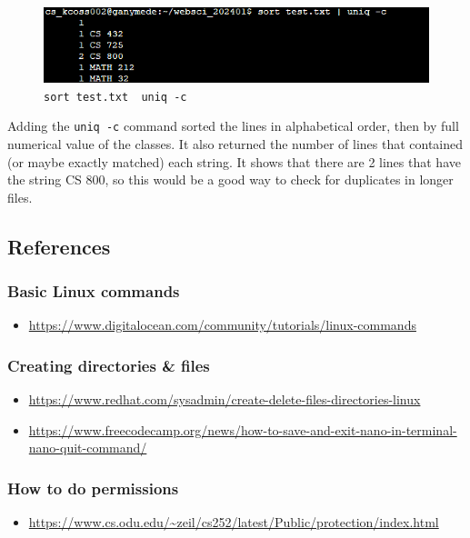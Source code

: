 \documentclass[
]{article}
\providecommand{\tightlist}{%
  \setlength{\itemsep}{0pt}\setlength{\parskip}{0pt}}
\begin{document}
\begin{figure}
\centering
\includegraphics{linux_cmd_8_sortuniq.png}
\caption{\texttt{sort\ test.txt\ \textbar{}\ uniq\ -c}}
\end{figure}

Adding the \texttt{uniq\ -c} command sorted the lines in alphabetical
order, then by full numerical value of the classes. It also returned the
number of lines that contained (or maybe exactly matched) each string.
It shows that there are 2 lines that have the string CS 800, so this
would be a good way to check for duplicates in longer files.

\hypertarget{references}{%
\subsection{\texorpdfstring{\textbf{References}}{References}}\label{references}}

\hypertarget{basic-linux-commands}{%
\subsubsection{Basic Linux commands}\label{basic-linux-commands}}

\begin{itemize}
\tightlist
\item
  \url{https://www.digitalocean.com/community/tutorials/linux-commands}
\end{itemize}

\hypertarget{creating-directories-files}{%
\subsubsection{Creating directories \&
files}\label{creating-directories-files}}

\begin{itemize}
\item
  \url{https://www.redhat.com/sysadmin/create-delete-files-directories-linux}
\item
  \url{https://www.freecodecamp.org/news/how-to-save-and-exit-nano-in-terminal-nano-quit-command/}
\end{itemize}

\hypertarget{how-to-do-permissions}{%
\subsubsection{How to do permissions}\label{how-to-do-permissions}}

\begin{itemize}
\tightlist
\item
  \url{https://www.cs.odu.edu/~zeil/cs252/latest/Public/protection/index.html}
\end{itemize}
\end{document}
